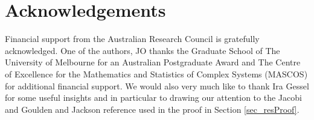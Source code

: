 \documentclass[11pt,a4paper]{article}
\begin{document}
  



\section*{Acknowledgements}

Financial support from the Australian Research Council is gratefully
acknowledged. One of the authors, JO thanks the
Graduate School of The University of Melbourne for an Australian
Postgraduate Award and The Centre of Excellence for the Mathematics and Statistics of Complex Systems (MASCOS) for additional financial support. We would also very much like to thank  Ira Gessel for some useful insights and in particular to drawing our attention to the Jacobi and Goulden and Jackson reference \cite{goulden:1983yg} used in the proof in Section \ref{sec_resProof}.    



\end{document}
